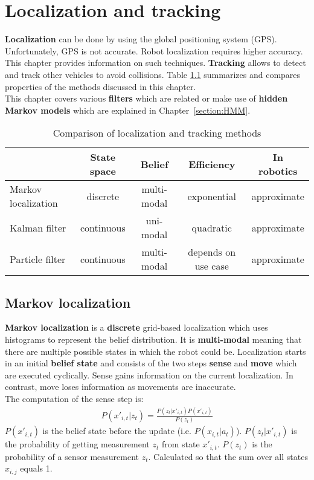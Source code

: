 \documentclass{report}
\begin{document}
\chapter{Localization and tracking}
\label{chapter:localizationandtracking}
{\bf Localization} can be done by using the global positioning system (GPS). Unfortunately, GPS is not accurate. Robot localization requires higher accuracy. This chapter provides information on such techniques.
{\bf Tracking} allows to detect and track other vehicles to avoid collisions.
Table \ref{ref:complocalization} summarizes and compares properties of the methods discussed in this chapter. \\
This chapter covers various {\bf filters} which are related or make use of {\bf hidden Markov models} which are explained in Chapter~\ref{section:HMM}.
\begin{table}[h!]
\begin{center}
\begin{tabular}{l||c|c|c|c}
 & State space & Belief & Efficiency & In robotics \\
\hline
\hline
Markov localization & discrete & multi-modal & exponential & approximate \\
\hline
Kalman filter & continuous & uni-modal & quadratic & approximate \\
\hline
Particle filter & continuous & multi-modal & depends on use case & approximate \\

\end{tabular}
\end{center}
\caption{Comparison of localization and tracking methods}
\label{ref:complocalization}
\end{table}

\section{Markov localization}
{\bf Markov localization} is a {\bf discrete} grid-based localization which uses histograms to represent the belief distribution. It is {\bf multi-modal} meaning that there are multiple possible states in which the robot could be. Localization starts in an initial {\bf belief state} and consists of the two steps {\bf sense} and {\bf move} which are executed cyclically. Sense gains information on the current localization. In contrast, move loses information as movements are inaccurate. \\
The computation of the sense step is: \\
\begin{align*}
P(x'_{i,t}\vert z_t) = \frac{P(z_t\vert x'_{i,t})P(x'_{i,t})}{P(z_t)}
\end{align*}
$P(x'_{i,t})$ is the belief state before the update (i.e. $P(x_{i,t}\vert a_t)$). $P(z_t\vert x'_{i,t})$ is the probability of getting measurement $z_t$ from state $x'_{i,t}$. $P(z_t)$ is the probability of a sensor measurement $z_t$. Calculated so that the sum over all states $x_{i,j}$ equals 1.
\end{document}
